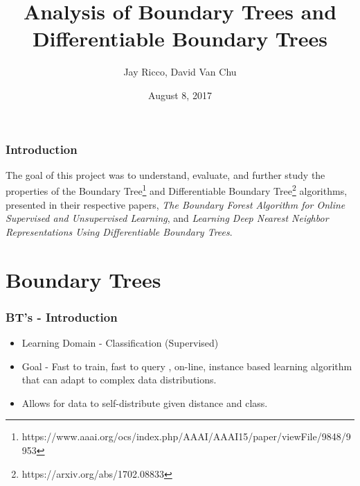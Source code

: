 \documentclass[pdf]{beamer}
\title{Analysis of Boundary Trees and Differentiable Boundary Trees}
\author{Jay Ricco, David Van Chu}
\institute{Wentworth Institute of Technology}
\date{August 8, 2017}
\begin{document}
	
	\begin{frame}
		\titlepage
	\end{frame}

	\begin{frame}
		\frametitle{Introduction}
		The goal of this project was to understand, evaluate, and further study the properties of the Boundary Tree\footnote[1]{https://www.aaai.org/ocs/index.php/AAAI/AAAI15/paper/viewFile/9848/9953} and Differentiable Boundary Tree\footnote[2]{https://arxiv.org/abs/1702.08833} algorithms, presented in their respective papers, \textit{The Boundary Forest Algorithm for Online Supervised and Unsupervised Learning}, and \textit{Learning Deep Nearest Neighbor Representations Using Differentiable Boundary Trees}.\\ 
		
	\end{frame}

	\section{Boundary Trees}
	\begin{frame}
		\frametitle{BT's - Introduction}
		
		\begin{itemize}
			\item Learning Domain - Classification (Supervised)
			\item Goal - Fast to train, fast to query , on-line, instance based learning algorithm that can adapt to complex data distributions.
			\item Allows for data to self-distribute given distance and class.
		\end{itemize}
	\end{frame}
\end{document}
